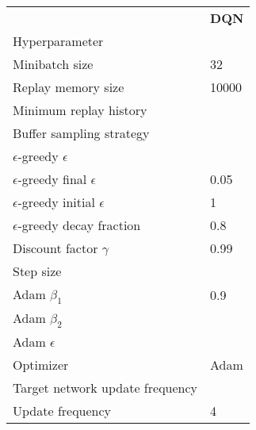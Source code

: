 \begin{tabular}{ll}
 & \bfseries DQN \\
Hyperparameter &  \\
Minibatch size & 32 \\
Replay memory size & 10000 \\
Minimum replay history &  \\
Buffer sampling strategy &  \\
$\epsilon$-greedy $\epsilon$ &  \\
$\epsilon$-greedy final $\epsilon$ & 0.05 \\
$\epsilon$-greedy initial $\epsilon$ & 1 \\
$\epsilon$-greedy decay fraction & 0.8 \\
Discount factor $\gamma$ & 0.99 \\
Step size &  \\
Adam $\beta_1$ & 0.9 \\
Adam $\beta_2$ &  \\
Adam $\epsilon$ &  \\
Optimizer & Adam \\
Target network update frequency &  \\
Update frequency & 4 \\
\end{tabular}
